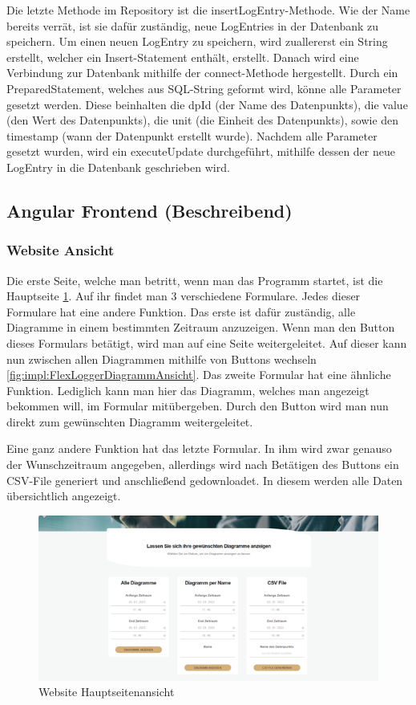 Die letzte Methode im Repository ist die insertLogEntry-Methode. Wie der Name bereits verrät, ist sie dafür zuständig, neue LogEntries in der Datenbank zu speichern. Um einen neuen LogEntry zu speichern, wird zuallererst ein String erstellt, welcher ein Insert-Statement enthält, erstellt. 
Danach wird eine Verbindung zur Datenbank mithilfe der connect-Methode hergestellt. Durch ein PreparedStatement, welches aus SQL-String geformt wird, könne alle Parameter gesetzt werden. Diese beinhalten die dpId (der Name des Datenpunkts), die value (den Wert des Datenpunkts), die unit (die Einheit des Datenpunkts), sowie den timestamp (wann der Datenpunkt erstellt wurde). Nachdem alle Parameter gesetzt wurden, wird ein executeUpdate durchgeführt, mithilfe dessen der neue LogEntry in die Datenbank geschrieben wird. 

\subsection{Angular Frontend (Beschreibend)}
\subsubsection{Website Ansicht}
Die erste Seite, welche man betritt, wenn man das Programm startet, ist die Hauptseite \ref{fig:impl:FlexLoggerHauptseitenAnsicht}. Auf ihr findet man 3 verschiedene Formulare. Jedes dieser Formulare hat eine andere Funktion. Das erste ist dafür zuständig, alle Diagramme in einem bestimmten Zeitraum anzuzeigen. Wenn man den Button dieses Formulars betätigt, wird man auf eine Seite weitergeleitet. Auf dieser kann nun zwischen allen Diagrammen mithilfe von Buttons wechseln \ref{fig:impl:FlexLoggerDiagrammAnsicht}. Das zweite Formular hat eine ähnliche Funktion. Lediglich kann man hier das Diagramm, welches man angezeigt bekommen will, im Formular mitübergeben. Durch den Button wird man nun direkt zum gewünschten Diagramm weitergeleitet. 

Eine ganz andere Funktion hat das letzte Formular. In ihm wird zwar genauso der Wunschzeitraum angegeben, allerdings wird nach Betätigen des Buttons ein CSV-File generiert und anschließend gedownloadet. In diesem werden alle Daten übersichtlich angezeigt. 



\begin{figure}
    \centering
    \includegraphics[scale=0.5]{pics/FlexLoggerWebsiteFormulare.png}
    \caption{Website Hauptseitenansicht}
    \label{fig:impl:FlexLoggerHauptseitenAnsicht}
\end{figure}

